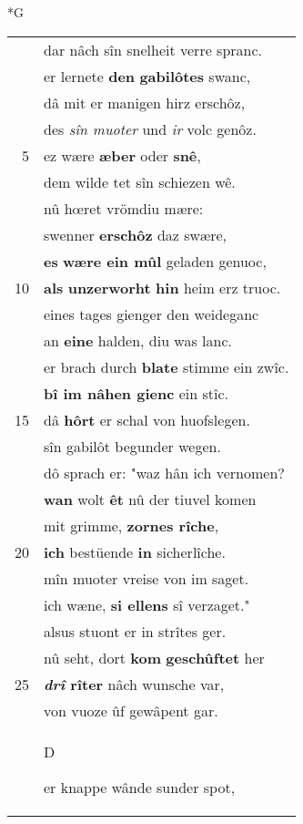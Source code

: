 \documentclass[8pt,a4paper,notitlepage]{article}
\begin{document}
\newpage
\begin{table}[ht]
\begin{minipage}[t]{0.5\linewidth}
\small
\begin{center}*G
\end{center}
\begin{tabular}{rl}
 & dar nâch sîn snelheit verre spranc.\\ 
 & er lernete \textbf{den} \textbf{gabilôtes} swanc,\\ 
 & dâ mit er manigen hirz erschôz,\\ 
 & des \textit{sîn muoter} und \textit{ir} volc genôz.\\ 
5 & ez wære \textbf{æber} oder \textbf{snê},\\ 
 & dem wilde tet sîn schiezen wê.\\ 
 & nû hœret vrömdiu mære:\\ 
 & swenner \textbf{erschôz} daz swære,\\ 
 & \textbf{es} \textbf{wære ein mûl} geladen genuoc,\\ 
10 & \textbf{als} \textbf{unzerworht} \textbf{hin} heim erz truoc.\\ 
 & eines tages gienger den weideganc\\ 
 & an \textbf{eine} halden, diu was lanc.\\ 
 & er brach durch \textbf{blate} stimme ein zwîc.\\ 
 & \textbf{bî im nâhen gienc} ein stîc.\\ 
15 & dâ \textbf{hôrt} er schal von huofslegen.\\ 
 & sîn gabilôt begunder wegen.\\ 
 & dô sprach er: "waz hân ich vernomen?\\ 
 & \textbf{wan} wolt \textbf{êt} nû der tiuvel komen\\ 
 & mit grimme, \textbf{zornes rîche},\\ 
20 & \textbf{ich} bestüende \textbf{in} sicherlîche.\\ 
 & mîn muoter vreise von im saget.\\ 
 & ich wæne, \textbf{si ellens} sî verzaget."\\ 
 & alsus stuont er in strîtes ger.\\ 
 & nû seht, dort \textbf{kom} \textbf{geschûftet} her\\ 
25 & \textbf{\textit{drî} rîter} nâch wunsche var,\\ 
 & von vuoze ûf gewâpent gar.\\ 
 & \begin{large}D\end{large}er knappe wânde sunder spot,\\ 

\end{tabular}
\end{minipage}
\end{table}
\end{document}
